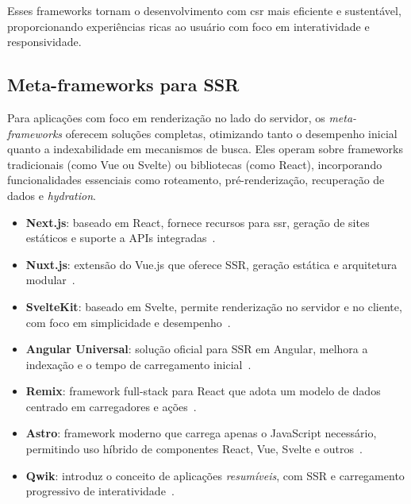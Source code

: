 Esses frameworks tornam o desenvolvimento com \acrshort{csr} mais eficiente e sustentável, proporcionando experiências ricas ao usuário com foco em interatividade e responsividade.

\subsection{Meta-frameworks para SSR}
\label{subsec:frameworks-ssr}

Para aplicações com foco em renderização no lado do servidor, os \emph{meta-frameworks} oferecem soluções completas, otimizando tanto o desempenho inicial quanto a indexabilidade em mecanismos de busca. Eles operam sobre frameworks tradicionais (como Vue ou Svelte) ou bibliotecas (como React), incorporando funcionalidades essenciais como roteamento, pré-renderização, recuperação de dados e \textit{hydration}.

\begin{itemize}
    \item \textbf{Next.js}: baseado em React, fornece recursos para \acrshort{ssr}, geração de sites estáticos e suporte a APIs integradas~\cite{nextjs2024}.
    
    \item \textbf{Nuxt.js}: extensão do Vue.js que oferece SSR, geração estática e arquitetura modular~\cite{nuxtjs2024}.
    
    \item \textbf{SvelteKit}: baseado em Svelte, permite renderização no servidor e no cliente, com foco em simplicidade e desempenho~\cite{sveltekit2024}.
    
    \item \textbf{Angular Universal}: solução oficial para SSR em Angular, melhora a indexação e o tempo de carregamento inicial~\cite{angularuniversal2024}.
    
    \item \textbf{Remix}: framework full-stack para React que adota um modelo de dados centrado em carregadores e ações~\cite{remix2024}.
    
    \item \textbf{Astro}: framework moderno que carrega apenas o JavaScript necessário, permitindo uso híbrido de componentes React, Vue, Svelte e outros~\cite{astro2024}.
    
    \item \textbf{Qwik}: introduz o conceito de aplicações \textit{resumíveis}, com SSR e carregamento progressivo de interatividade~\cite{qwik2024}.
\end{itemize}

